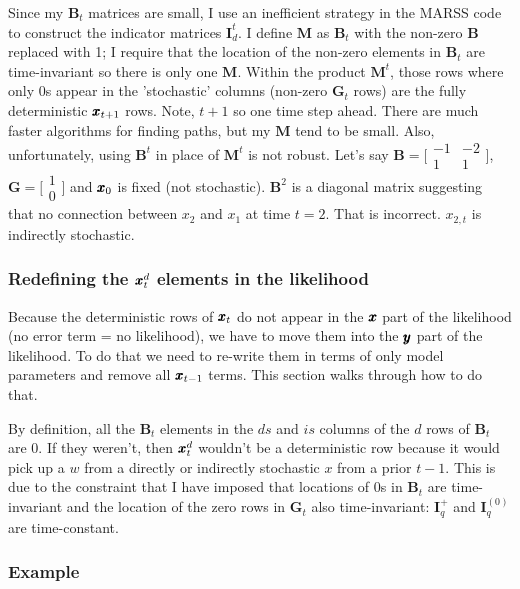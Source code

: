 \documentclass[]{article}
\def\UPS{\mbox{\boldmath $\Upsilon$}}
\def\BB{\mbox{$\mathbf B$}}	\def\bb{\mbox{$\mathbf b$}} \def\Bb{\mbox{$\mathbf J$}} \def\Ba{\mbox{$\mathbf L$}} \def\Bm{\UPS}
\def\GG{\mbox{$\mathbf G$}}	\def\gg{\mbox{$\mathbf g$}}
\def\II{\mbox{$\mathbf I$}} \def\ii{\mbox{$\mathbf i$}}
\def\MM{\mbox{$\mathbf M$}}  \def\mm{\mbox{$\mathbf m$}}
\begin{document}
Since my $\BB_t$ matrices are small, I use an  inefficient strategy in the MARSS code to construct the indicator matrices $\II_d^t$.  I define $\MM$ as $\BB_t$ with the non-zero $\BB$ replaced with 1; I require that the location of the non-zero elements in $\BB_t$ are time-invariant so there is only one $\MM$.  Within the product $\MM^t$, those rows where only 0s appear in the 'stochastic' columns (non-zero $\GG_t$ rows) are the fully deterministic $\mbox{$\pmb{x}$}_{t+1}$ rows. Note, $t+1$ so one time step ahead.  There are much faster algorithms for finding paths, but my $\MM$ tend to be small.  Also, unfortunately, using $\BB^t$ in place of $\MM^t$ is not robust. Let's say $\BB=\bigl[ \begin{smallmatrix}-1&-2\\ 1&1\end{smallmatrix} \bigr]$, $\GG=\bigl[ \begin{smallmatrix}1\\ 0\end{smallmatrix} \bigr]$ and $\mbox{$\pmb{x}$}_0$ is fixed (not stochastic).
$\BB^2$ is a diagonal matrix suggesting that no connection between $x_2$ and $x_1$ at time $t=2$. That is incorrect. $x_{2,t}$ is indirectly stochastic.

\subsubsection{Redefining the $\mbox{$\pmb{x}$}_t^d$ elements in the likelihood}
Because the deterministic rows of $\mbox{$\pmb{x}$}_t$ do not appear in the $\mbox{$\pmb{x}$}$ part of the likelihood (no error term = no likelihood), we have to move them into the $\mbox{$\pmb{y}$}$ part of the likelihood. To do that we need to re-write them in terms of only model parameters and remove all $\mbox{$\pmb{x}$}_{t-1}$ terms. This section walks through how to do that.

By definition, all the $\BB_t$ elements in the $ds$ and $is$ columns of the $d$ rows of $\BB_t$ are 0. If they weren't, then $\mbox{$\pmb{x}$}_t^d$ wouldn't be a deterministic row because it would pick up a $w$ from a directly or indirectly stochastic $x$ from a prior $t-1$.  This is due to the constraint that I have imposed that locations of 0s in $\BB_t$ are time-invariant and the location of the zero rows in $\GG_t$ also time-invariant: $\II_q^{+}$ and $\II_q^{(0)}$ are time-constant. 

\subsubsection*{Example}
\end{document}

